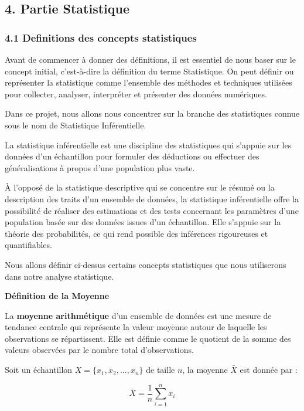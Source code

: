 \documentclass[
]{article}
\begin{document}
\subsection{4. Partie Statistique}\label{partie-statistique}

\subsubsection{4.1 Definitions des concepts
statistiques}\label{definitions-des-concepts-statistiques}

Avant de commencer à donner des définitions, il est essentiel de nous
baser sur le concept initial, c'est-à-dire la définition du terme
Statistique. On peut définir ou représenter la statistique comme
l'ensemble des méthodes et techniques utilisées pour collecter,
analyser, interpréter et présenter des données numériques.

Dans ce projet, nous allons nous concentrer sur la branche des
statistiques connue sous le nom de Statistique Inférentielle.

La statistique inférentielle est une discipline des statistiques qui
s'appuie sur les données d'un échantillon pour formuler des déductions
ou effectuer des généralisations à propos d'une population plus vaste.

À l'opposé de la statistique descriptive qui se concentre sur le résumé
ou la description des traits d'un ensemble de données, la statistique
inférentielle offre la possibilité de réaliser des estimations et des
tests concernant les paramètres d'une population basée sur des données
issues d'un échantillon. Elle s'appuie sur la théorie des probabilités,
ce qui rend possible des inférences rigoureuses et quantifiables.

Nous allons définir ci-dessus certains concepts statistiques que nous
utiliserons dans notre analyse statistique.

\textbf{Définition de la Moyenne}

La \textbf{moyenne arithmétique} d'un ensemble de données est une mesure
de tendance centrale qui représente la valeur moyenne autour de laquelle
les observations se répartissent. Elle est définie comme le quotient de
la somme des valeurs observées par le nombre total d'observations.

Soit un échantillon \(X = \{x_1, x_2, ..., x_n\}\) de taille \(n\), la
moyenne \(\bar{X}\) est donnée par :

\[
\bar{X} = \frac{1}{n} \sum_{i=1}^{n} x_i
\]
\end{document}
